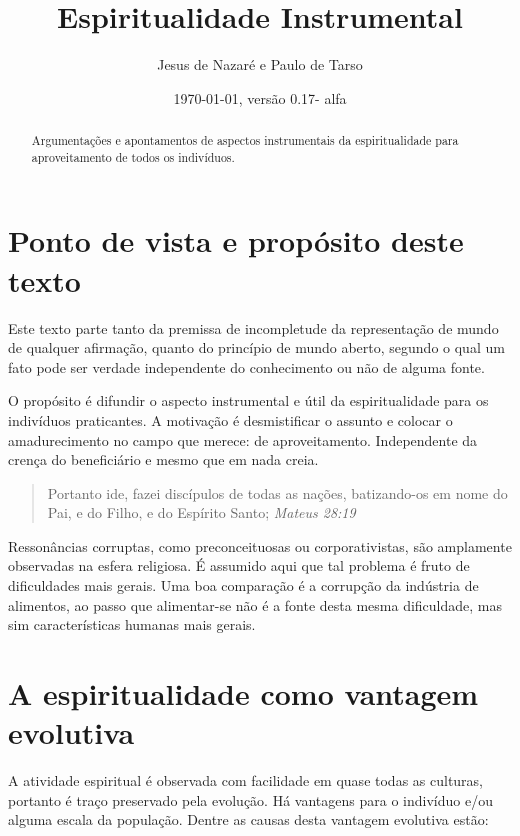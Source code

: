 \documentclass[a4paper]{article}
\title{Espiritualidade Instrumental}
\author{Jesus de Nazaré e Paulo de Tarso}
\date{\today, versão 0.17- alfa}
\begin{document}
\maketitle

\begin{abstract}
Argumentações e apontamentos de aspectos instrumentais da espiritualidade para
aproveitamento de todos os indivíduos.
\end{abstract}

\tableofcontents

\section{Ponto de vista e propósito deste texto}

\qquad Este texto parte tanto da premissa de incompletude da representação de
mundo de qualquer afirmação, quanto do princípio de mundo aberto, segundo o qual
um fato pode ser verdade independente do conhecimento ou não de alguma fonte.

O propósito é difundir o aspecto instrumental e útil da espiritualidade para os
indivíduos praticantes. A motivação é desmistificar o assunto e colocar o
amadurecimento no campo que merece: de aproveitamento. Independente da crença do
beneficiário e mesmo que em nada creia.

\begin{quotation}
  Portanto ide, fazei discípulos de todas as nações, batizando-os em nome do
  Pai, e do Filho, e do Espírito Santo; \textit{Mateus 28:19}
\end{quotation}

Ressonâncias corruptas, como preconceituosas ou corporativistas, são amplamente
observadas na esfera religiosa. É assumido aqui que tal problema é fruto de
dificuldades mais gerais. Uma boa comparação é a corrupção da indústria de
alimentos, ao passo que alimentar-se não é a fonte desta mesma dificuldade, mas
sim características humanas mais gerais.

\section{A espiritualidade como vantagem evolutiva}

\qquad A atividade espiritual é observada com facilidade em quase todas as
culturas, portanto é traço preservado pela evolução. Há vantagens para o
indivíduo e/ou alguma escala da população. Dentre as causas desta vantagem
evolutiva estão:
\end{document}
